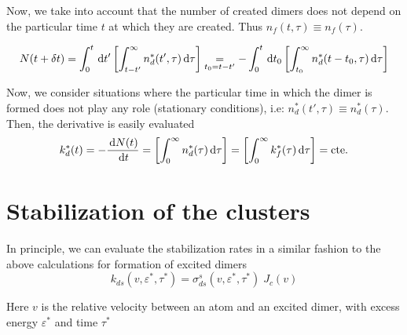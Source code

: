 Now, we take into account that the number of created dimers does not depend on the particular time $t$ at which they are created. Thus $n_{f}(t,\tau) \equiv n_{f}(\tau)$.


\begin{equation}
  \label{Q:rates-number-excit-dimers}
  N(t+ \delta t) = \int_{0}^{t} \,\mathrm{d} t' \left[\int_{t-t'}^{\infty} n_{d}^{*}(t',\tau) \,\mathrm{d} \tau \right] \mathrel{\mathop{\kern0pt=}\limits_{t_{0}=t-t'}} -\int_{0}^{t} \,\mathrm{d} t_{0} \left[\int_{t_{0}}^{\infty} n_{d}^{*}(t-t_{0},\tau) \,\mathrm{d} \tau \right]
\end{equation}

Now, we consider situations where the particular time in which the dimer is formed does not play any role (stationary conditions), i.e: $n_{d}^{*}(t',\tau) \equiv n_{d}^{*}(\tau)$. Then, the derivative is easily evaluated
\begin{equation}
  \label{Q:rates-number-excit-dimers-simpler}
  k_{d}^{*}(t)= -\frac{\,\mathrm{d} N(t)}{\,\mathrm{d} t} =  \left[\int_{0}^{\infty} n_{d}^{*}(\tau) \,\mathrm{d} \tau \right] =  \left[\int_{0}^{\infty} k_{f}^{*}(\tau) \,\mathrm{d} \tau \right] = \text{cte.}
\end{equation}


\section{Stabilization of the clusters}
\label{S:stabil-cluster}

In principle, we can evaluate the stabilization rates in a similar fashion to the above calculations for formation of excited dimers
\begin{equation}
  \label{Q:rates-def-stabil-rate}
    k_{ds}(v , \varepsilon^{*}, \tau^{*}) = \sigma_{ds}^{s}(v, \varepsilon^{*}, \tau^{*}) \; J_{c}(v)
\end{equation}

Here $v$ is the relative velocity between an atom and an excited dimer, with excess energy $\varepsilon^{*}$ and time $\tau^{*}$


